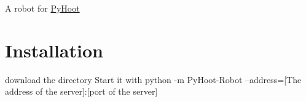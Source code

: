 A robot for \hyperlink{namespace_py_hoot}{Py\+Hoot}

\section*{Installation}

download the directory Start it with python -\/m Py\+Hoot-\/\+Robot --address=\mbox{[}The address of the server\mbox{]}\+:\mbox{[}port of the server\mbox{]} 
